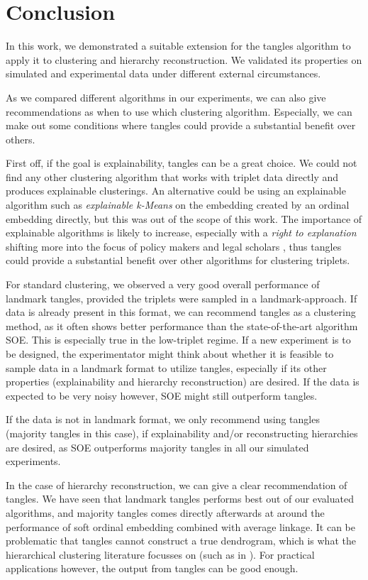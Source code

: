\chapter{Conclusion}\label{conclusion}
In this work, we demonstrated a suitable extension for the tangles algorithm to apply it to clustering and hierarchy reconstruction. 
We validated its properties on simulated and experimental data under different external circumstances. 

As we compared different algorithms in our experiments, we can also give recommendations as when to use which clustering algorithm. Especially, we can make out
some conditions where tangles could provide a substantial benefit over others. 

First off, if the goal is explainability, tangles can be a great choice. We could not find any other clustering algorithm that works with triplet data directly and produces
explainable clusterings. An alternative could be using an explainable algorithm such as \textit{explainable k-Means} \citep{moshkovitzExplainableKMeansKMedians2020} on the embedding created 
by an ordinal embedding directly, but this was out of the scope of this work. 
The importance of explainable algorithms is likely to increase, especially with 
a \textit{right to explanation} shifting more into the focus of policy makers and legal
scholars \citep{selbstMeaningfulInformationRight2017}, thus tangles could provide a substantial benefit over other algorithms for clustering triplets.

For standard clustering, we observed a very good overall performance of landmark tangles, provided the triplets were sampled in a landmark-approach. 
If data is already present in this format, we can recommend
tangles as a clustering method, as it often shows better performance than the state-of-the-art algorithm SOE. This is especially true in the low-triplet regime. 
If a new experiment is to be designed, the experimentator might think
about whether it is feasible to sample data in a landmark format to utilize tangles, especially if its other properties (explainability and hierarchy reconstruction) are desired. 
If the data is expected to be very noisy however, SOE might still outperform tangles. 

If the data is not in landmark format, we only recommend using tangles (majority tangles in this case), if explainability and/or reconstructing hierarchies are desired, as SOE 
outperforms majority tangles in all our simulated experiments.

In the case of hierarchy reconstruction, we can give a clear recommendation of tangles. We have seen that landmark tangles performs best out of our evaluated algorithms, and majority tangles 
comes directly afterwards at around the performance of soft ordinal embedding combined with average linkage. 
It can be problematic that tangles cannot construct a true dendrogram, which is what the hierarchical clustering literature focusses on (such as in \cite{ghoshdastidarFoundationsComparisonBasedHierarchical2019}). 
For practical applications however, the output from tangles can be good enough. 

